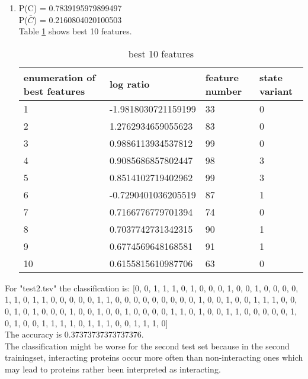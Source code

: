 \documentclass[10pt,a4paper]{article}
\begin{document}
\begin{enumerate}
\item P(C) = 0.7839195979899497\\
P($\bar{C}$) = 0.2160804020100503\\
Table \ref{tab2} shows best 10 features.\\
\begin{table}[b]
\label{tab2}
\begin{tabular}{llll}
enumeration of best features & log ratio & feature number & state variant\\
\hline
1 & -1.9818030721159199 & 33 & 0\\
2 & 1.2762934659055623 & 83 & 0\\
3 & 0.9886113934537812 & 99 & 0\\
4 & 0.9085686857802447 & 98 & 3\\
5 & 0.8514102719402962 & 99 & 3\\
6 & -0.7290401036205519 & 87 & 1\\
7 & 0.7166776779701394 & 74 & 0\\
8 & 0.7037742731342315 & 90 & 1\\
9 & 0.6774569648168581 & 91 & 1\\
10 & 0.6155815610987706 & 63 & 0\\
\end{tabular}
\caption{best 10 features}
\end{table}
\end{enumerate}
For "test2.tsv" the classification is: [0, 0, 1, 1, 1, 0, 1, 0, 0, 0, 1, 0, 0, 1, 0, 0, 0, 0, 1, 1, 0, 1, 1, 0, 0, 0, 0, 0, 1, 1, 0, 0, 0, 0, 0, 0, 0, 0, 0, 1, 0, 0, 1, 0, 0, 1, 1, 1, 0, 0, 0, 1, 0, 1, 0, 0, 0, 1, 0, 0, 1, 0, 0, 1, 0, 0, 0, 0, 1, 1, 0, 1, 0, 0, 1, 1, 0, 0, 0, 0, 0, 1, 0, 1, 0, 0, 1, 1, 1, 1, 0, 1, 1, 1, 0, 0, 1, 1, 1, 0]\\
The accuracy is 0.37373737373737376.\\
The classification might be worse for the second test set because in the second trainingset, interacting proteins occur more often than non-interacting ones which may lead to proteins rather been interpreted as interacting.
\end{document}
